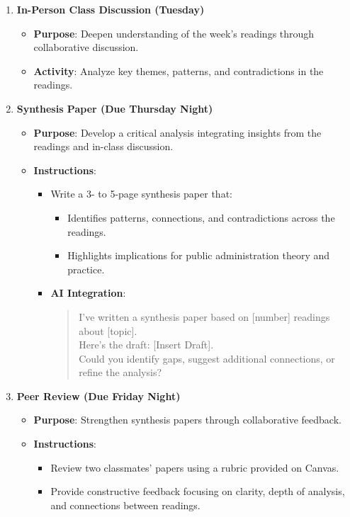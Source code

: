 \documentclass[12pt, letterpaper]{article}
\begin{document}
\begin{enumerate}
    \item \textbf{In-Person Class Discussion (Tuesday)}
    \begin{itemize}
        \item \textbf{Purpose}: Deepen understanding of the week’s readings through collaborative discussion.
        \item \textbf{Activity}: Analyze key themes, patterns, and contradictions in the readings.
    \end{itemize}

    \item \textbf{Synthesis Paper (Due Thursday Night)}
    \begin{itemize}
        \item \textbf{Purpose}: Develop a critical analysis integrating insights from the readings and in-class discussion.
        \item \textbf{Instructions}:
        \begin{itemize}
            \item Write a 3- to 5-page synthesis paper that:
            \begin{itemize}
                \item Identifies patterns, connections, and contradictions across the readings.
                \item Highlights implications for public administration theory and practice.
            \end{itemize}
            \item \textbf{AI Integration}:
            \begin{quote}
                I’ve written a synthesis paper based on [number] readings about [topic]. \\ 
                Here’s the draft: [Insert Draft]. \\ 
                Could you identify gaps, suggest additional connections, or refine the analysis?
            \end{quote}
        \end{itemize}
    \end{itemize}

    \item \textbf{Peer Review (Due Friday Night)}
    \begin{itemize}
        \item \textbf{Purpose}: Strengthen synthesis papers through collaborative feedback.
        \item \textbf{Instructions}:
        \begin{itemize}
            \item Review two classmates’ papers using a rubric provided on Canvas.
            \item Provide constructive feedback focusing on clarity, depth of analysis, and connections between readings.
        \end{itemize}
    \end{itemize}


\end{enumerate}
\end{document}

